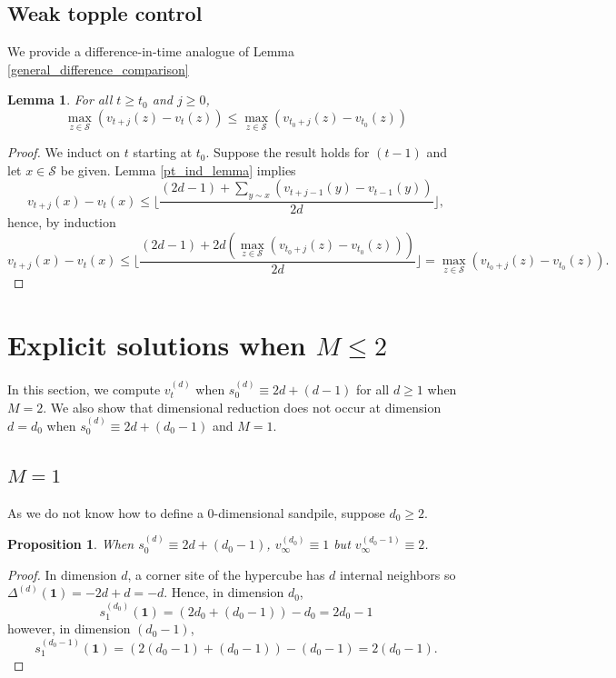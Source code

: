 \documentclass[12pt]{amsart}
\newtheorem{prop}{Proposition}[section]
\newtheorem{lemma}[theorem]{Lemma}
\begin{document}
	
	\subsection{Weak topple control}	
	We provide a difference-in-time analogue of Lemma \ref{general_difference_comparison}

	\begin{lemma} \label{topple_limit}
	For all $t \geq t_0$ and $j \geq 0$, 
	\[
	\max_{z \in \mathcal{S}} \left( v_{t+j}(z) - v_t(z) \right) \leq \max_{z \in \mathcal{S}} \left( v_{t_0+j}(z) - v_{t_0}(z) \right)
	\]
	\end{lemma}

	
	\begin{proof}
		We induct on $t$ starting at $t_0$. Suppose the result holds for $(t-1)$
		and let $x \in \mathcal{S}$ be given.
		Lemma \ref{pt_ind_lemma} implies  
		\[
		v_{t + j}(x) - v_{t}(x) \leq \lfloor \frac{ (2d-1) + \sum_{y \sim x} \left(v_{t+j-1}(y) - v_{t-1}(y) \right) }{2 d} \rfloor, 
		\]		
		hence, by induction 
		\[
			v_{t + j}(x) - v_{t}(x) \leq \lfloor \frac{ (2d-1) + 2 d\left( \max_{z \in \mathcal{S}} \left( v_{t_0+j}(z) - v_{t_0}(z) \right) \right) }{2 d} \rfloor =  \max_{z \in \mathcal{S}} \left( v_{t_0+j}(z) - v_{t_0}(z) \right). 
		\]

		
	\end{proof}
	
	
	
	\section{Explicit solutions when \texorpdfstring{$M \leq 2$}{M <= 2}} \label{sec:base_case}
	
	In this section, we compute $v_t^{(d)}$ when $s_0^{(d)} \equiv 2 d + (d-1)$ for all $d \geq 1$ when $M=2$.
	We also show that dimensional reduction does not occur at dimension
	$d=d_0$ when $s^{(d)}_0 \equiv 2 d + (d_0-1)$ and $M=1$. 
	
	
	
	\subsection{\texorpdfstring{$M=1$}{M=1}}
	As we do not know how to define a $0$-dimensional sandpile, suppose $d_0 \geq 2$. 
	\begin{prop}\label{no_reduction}
	 When $s_0^{(d)} \equiv 2 d + (d_0-1)$,  $v_\infty^{(d_0)} \equiv 1$ but $v_\infty^{(d_0-1)} \equiv 2$.
	\end{prop}
	\begin{proof} 
		In dimension $d$, a corner site of the hypercube has $d$ internal neighbors so 
		$\Delta^{(d)} (\mathbf{1}) = - 2 d + d = -d $.
		Hence, in dimension $d_0$, 
		\[
		s_1^{(d_0)}(\mathbf{1}) = (2 d_0 + (d_0-1))- d_0 = 2 d_0 - 1
		\]
		however, in dimension $(d_0-1)$, 
		\[
		s_1^{(d_0-1)}(\mathbf{1}) = (2 (d_0-1) + (d_0-1)) - (d_0-1) = 2(d_0-1).
		\]
	\end{proof}
	
\end{document}
